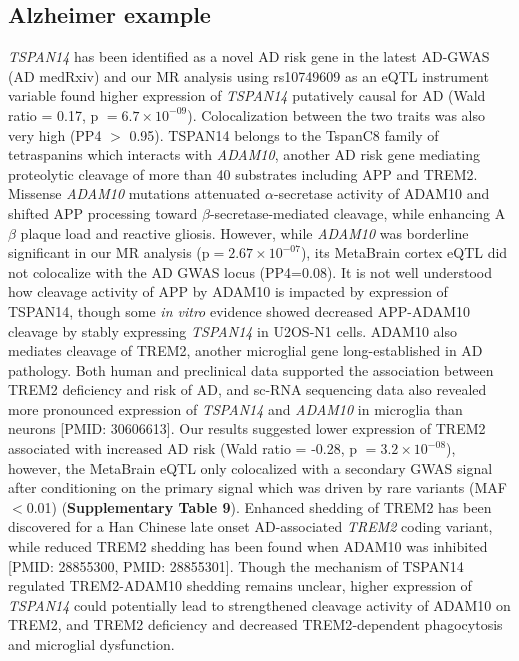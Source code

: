 {{\subsection{Alzheimer example}
\emph{TSPAN14} has been identified as a novel AD risk gene in the latest AD-GWAS (AD medRxiv) and our MR analysis using rs10749609 as an eQTL instrument variable found higher expression of \emph{TSPAN14} putatively causal for AD (Wald ratio = 0.17, p $= 6.7 \times 10^{-09}$). Colocalization between the two traits was also very high (PP4 $>$ 0.95). TSPAN14 belongs to the TspanC8 family of tetraspanins which interacts with \emph{ADAM10}, another AD risk gene mediating proteolytic cleavage of more than 40 substrates including APP and TREM2\cite{matthewsRegulationLeukocytesTspanC82018}. Missense \emph{ADAM10} mutations attenuated $\alpha$-secretase activity of ADAM10 and shifted APP processing toward $\beta$-secretase-mediated cleavage, while enhancing A$\beta$ plaque load and reactive gliosis\cite{suhADAM10MissenseMutations2013}. However, while \emph{ADAM10} was borderline significant in our MR analysis (p$= 2.67 \times 10^{-07}$), its MetaBrain cortex eQTL did not colocalize with the AD GWAS locus (PP4=0.08). It is not well understood how cleavage activity of APP by ADAM10 is impacted by expression of TSPAN14, though some \emph{in vitro} evidence showed decreased APP-ADAM10 cleavage by stably expressing \emph{TSPAN14} in U2OS-N1 cells\cite{jouannetTspanC8TetraspaninsDifferentially2016}. ADAM10 also mediates cleavage of TREM2, another microglial gene long-established in AD pathology\cite{ullandTREM2KeyPlayer2018}. Both human and preclinical data supported the association between TREM2 deficiency and risk of AD\cite{ullandTREM2KeyPlayer2018}, and sc-RNA sequencing data also revealed more pronounced expression of \emph{TSPAN14} and \emph{ADAM10} in microglia than neurons [PMID: 30606613]. Our results suggested lower expression of TREM2 associated with increased AD risk (Wald ratio = -0.28, p $= 3.2 \times 10^{-08}$), however, the MetaBrain eQTL only colocalized with a secondary GWAS signal after conditioning on the primary signal which was driven by rare variants (MAF$<$0.01) (\textbf{Supplementary Table 9}). Enhanced shedding of TREM2 has been discovered for a Han Chinese late onset AD-associated \emph{TREM2} coding variant, while reduced TREM2 shedding has been found when ADAM10 was inhibited [PMID: 28855300, PMID: 28855301]. Though the mechanism of TSPAN14 regulated TREM2-ADAM10 shedding remains unclear, higher expression of \emph{TSPAN14} could potentially lead to strengthened cleavage activity of ADAM10 on TREM2, and TREM2 deficiency and decreased TREM2‐dependent phagocytosis and microglial dysfunction. 

}}
